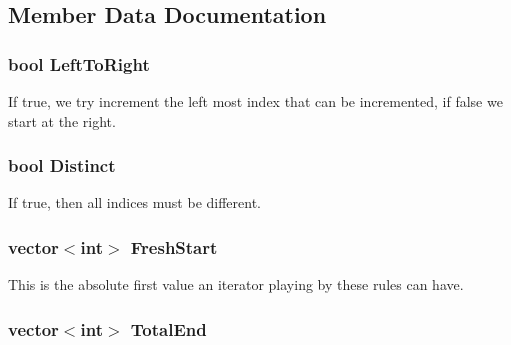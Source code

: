 \subsection{Member Data Documentation}
\hypertarget{classJKBuilder_1_1IteratorRules_afa98914b6f51cb9bd2eafa7c01a614e5}{
\subsubsection[{LeftToRight}]{\setlength{\rightskip}{0pt plus 5cm}bool {\bf LeftToRight}}}
\label{classJKBuilder_1_1IteratorRules_afa98914b6f51cb9bd2eafa7c01a614e5}


If true, we try increment the left most index that can be incremented, if false we start at the right. \hypertarget{classJKBuilder_1_1IteratorRules_a3cb2f931e32ad7450b106c2137dc5b7f}{
\subsubsection[{Distinct}]{\setlength{\rightskip}{0pt plus 5cm}bool {\bf Distinct}}}
\label{classJKBuilder_1_1IteratorRules_a3cb2f931e32ad7450b106c2137dc5b7f}


If true, then all indices must be different. \hypertarget{classJKBuilder_1_1IteratorRules_a405a336c1e1fa1b3a7a3e906b07722bf}{
\subsubsection[{FreshStart}]{\setlength{\rightskip}{0pt plus 5cm}vector$<$int$>$ {\bf FreshStart}}}
\label{classJKBuilder_1_1IteratorRules_a405a336c1e1fa1b3a7a3e906b07722bf}


This is the absolute first value an iterator playing by these rules can have. \hypertarget{classJKBuilder_1_1IteratorRules_a1e9f42e2eb6c6f9752414b8e43a3b36a}{
\subsubsection[{TotalEnd}]{\setlength{\rightskip}{0pt plus 5cm}vector$<$int$>$ {\bf TotalEnd}}}
\label{classJKBuilder_1_1IteratorRules_a1e9f42e2eb6c6f9752414b8e43a3b36a}


